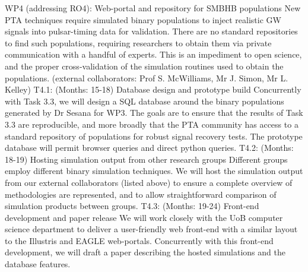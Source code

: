 \documentclass[11pt,letterpaper,sans]{moderncv} %
\begin{document}
WP4 (addressing RO4): Web-portal and repository for SMBHB populations
New PTA techniques require simulated binary populations to inject realistic GW signals into pulsar-timing data for validation. There are no standard repositories to find such populations, requiring researchers to obtain them via private communication with a handful of experts. This is an impediment to open science, and the proper cross-validation of the simulation routines used to obtain the populations.
(external collaborators: Prof S. McWilliams, Mr J. Simon, Mr L. Kelley)
	T4.1: (Months: 15-18) Database design and prototype build
	Concurrently with Task 3.3, we will design a SQL database around the binary populations generated by Dr Sesana for WP3. The goals are to ensure that the results of Task 3.3 are reproducible, and more broadly that the PTA community has access to a standard repository of populations for robust signal recovery tests. The prototype database will permit browser queries and direct python queries.
	T4.2: (Months: 18-19) Hosting simulation output from other research groups
Different groups employ different binary simulation techniques. We will host the simulation output from our external collaborators (listed above) to ensure a complete overview of methodologies are represented, and to allow straightforward comparison of simulation products between groups.
	T4.3: (Months: 19-24) Front-end development and paper release
We will work closely with the UoB computer science department to deliver a user-friendly web front-end with a similar layout to the Illustris and EAGLE web-portals. Concurrently with this front-end development, we will draft a paper describing the hosted simulations and the database features. 
\end{document}
